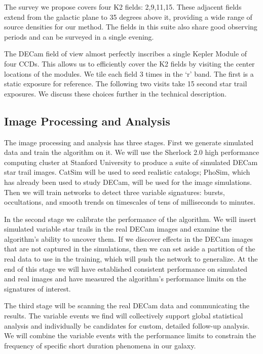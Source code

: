\documentclass[11pt]{article}
\begin{document}
The survey we propose covers four K2 fields: 2,9,11,15. These adjacent fields extend from the galactic plane to 35 degrees above it, providing a wide range of source densities for our method. The fields in this suite also share good observing periods and can be surveyed in a single evening.

The DECam field of view almost perfectly inscribes a single Kepler Module of four CCDs. This allows us to efficiently cover the K2 fields by visiting the center locations of the modules. We tile each field 3 times in the `r' band. The first is a static exposure for reference. The following two visits take 15 second star trail exposures. We discuss these choices further in the technical description. 

\subsection*{Image Processing and Analysis}

The image processing and analysis has three stages. First we generate simulated data and train the algorithm on it. We will use the Sherlock 2.0 high performance computing cluster at Stanford University to produce a suite of simulated DECam star trail images. CatSim will be used to seed realistic catalogs; PhoSim, which has already been used to study DECam, will be used for the image simulations. Then we will train networks to detect three variable signatures: bursts, occultations, and smooth trends on timescales of tens of milliseconds to minutes.

In the second stage we calibrate the performance of the algorithm. We will insert simulated variable star trails in the real DECam images and examine the algorithm's ability to uncover them. If we discover effects in the DECam images that are not captured in the simulations, then we can set aside a partition of the real data to use in the training, which will push the network to generalize. At the end of this stage we will have established consistent performance on simulated and real images and have measured the algorithm's performance limits on the signatures of interest.

The third stage will be scanning the real DECam data and communicating the results. The variable events we find will collectively support global statistical analysis and individually be candidates for custom, detailed follow-up analysis. We will combine the variable events with the performance limits to constrain the frequency of specific short duration phenomena in our galaxy. 
\end{document}
